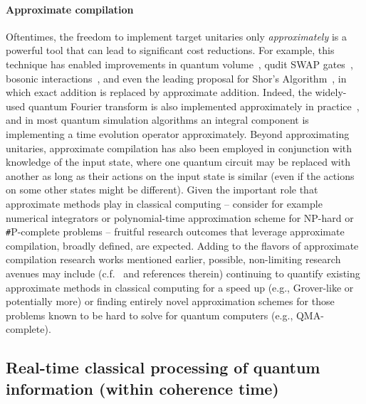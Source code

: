 \paragraph{Approximate compilation} Oftentimes, the freedom to implement target unitaries only \textit{approximately} is a powerful tool that can lead to significant cost reductions. For example, this technique has enabled improvements in quantum volume~\cite{cross2019validating}, qudit SWAP gates~\cite{campbell2023superstaq}, bosonic interactions~\cite{shaw2020quantum,kan2021lattice,kan2022simulating}, and even the leading proposal for Shor's Algorithm~\cite{gidney2021factor}, in which exact addition is replaced by approximate addition. Indeed, the widely-used quantum Fourier transform is also implemented approximately in practice~\cite{coppersmith2002approximate,nam2018automated}, and in most quantum simulation algorithms an integral component is implementing a time evolution operator approximately. Beyond approximating unitaries, approximate compilation has also been employed in conjunction with knowledge of the input state, where one quantum circuit may be replaced with another as long as their actions on the input state is similar (even if the actions on some other states might be different). Given the important role that approximate methods play in classical computing -- consider for example numerical integrators or polynomial-time approximation scheme for NP-hard or \texttt{\#}P-complete problems -- fruitful research outcomes that leverage approximate compilation, broadly defined, are expected. Adding to the flavors of approximate compilation research works mentioned earlier, possible, non-limiting research avenues may include (c.f.~\cite{campbell2019applying,pabst2022quantum,shaydulin2023evidence,dalzell2023quantum} and references therein) continuing to quantify existing approximate methods in classical computing for a speed up (e.g., Grover-like or potentially more) or finding entirely novel approximation schemes for those problems known to be hard to solve for quantum computers (e.g., QMA-complete).

\subsection{Real-time classical processing of quantum information (within coherence time)}
\label{realtimeQuantumClassical}


